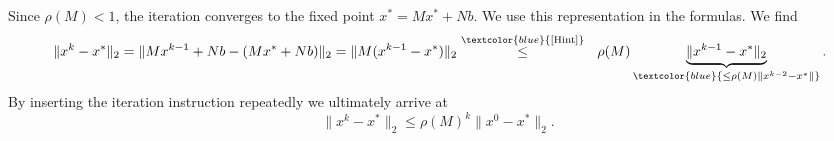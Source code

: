 {\color{solution}
Since $\rho(M)<1$, the iteration converges to the fixed point $x^* =Mx^*+Nb$. We use this representation in the formulas. We find
\begin{align*}
 \ \|{x^k-x^*}\|_2 = \|{Mx^{k-1}+Nb-(Mx^*+Nb)}\|_2 = \|{M(x^{k-1}-x^*)}\|_2
\stackrel{\textcolor{blue}{[\text{Hint}]}}{\leq}\ \ \rho(M)\underbrace{\|{x^{k-1}-x^*}\|_2}_{\textcolor{blue}{\leq\rho(M)\|{x^{k-2}-x^*}\|}}.
\end{align*}
By inserting the iteration instruction repeatedly we ultimately arrive at
$$\|{x^k-x^*}\|_2\leq \rho(M)^k\|{x^0-x^*}\|_2. $$
}

